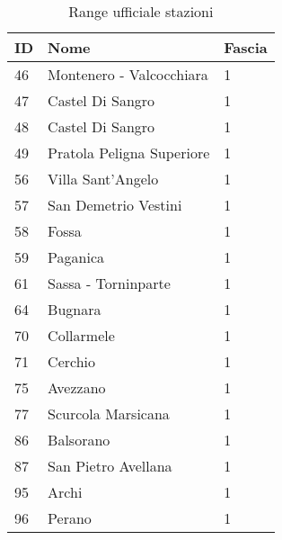 \begin{table}[]
\centering
\caption{Range ufficiale stazioni}
\label{my-label}
\begin{tabular}{|p{1cm}|p{4cm}|p{2cm}|}
\hline
\rowcolor[HTML]{C0C0C0} 
ID  & Nome                                     & Fascia \\ \hline
\rowcolor[HTML]{9AFF99} 
46  & Montenero - Valcocchiara                 & 1      \\ \hline
\rowcolor[HTML]{9AFF99} 
47  & Castel Di Sangro                         & 1      \\ \hline
\rowcolor[HTML]{9AFF99} 
48  & Castel Di Sangro                         & 1      \\ \hline
\rowcolor[HTML]{9AFF99} 
49  & Pratola Peligna Superiore                & 1      \\ \hline
\rowcolor[HTML]{9AFF99} 
56  & Villa Sant'Angelo                        & 1      \\ \hline
\rowcolor[HTML]{9AFF99} 
57  & San Demetrio Vestini                     & 1      \\ \hline
\rowcolor[HTML]{9AFF99} 
58  & Fossa                                    & 1      \\ \hline
\rowcolor[HTML]{9AFF99} 
59  & Paganica                                 & 1      \\ \hline
\rowcolor[HTML]{9AFF99} 
61  & Sassa - Torninparte                      & 1      \\ \hline
\rowcolor[HTML]{9AFF99} 
64  & Bugnara                                  & 1      \\ \hline
\rowcolor[HTML]{9AFF99} 
70  & Collarmele                               & 1      \\ \hline
\rowcolor[HTML]{9AFF99} 
71  & Cerchio                                  & 1      \\ \hline
\rowcolor[HTML]{9AFF99} 
75  & Avezzano                                 & 1      \\ \hline
\rowcolor[HTML]{9AFF99} 
77  & Scurcola Marsicana                       & 1      \\ \hline
\rowcolor[HTML]{9AFF99} 
86  & Balsorano                                & 1      \\ \hline
\rowcolor[HTML]{9AFF99} 
87  & San Pietro Avellana                      & 1      \\ \hline
\rowcolor[HTML]{9AFF99} 
95  & Archi                                    & 1      \\ \hline
\rowcolor[HTML]{9AFF99} 
96  & Perano                                   & 1      \\ \hline

\end{tabular}
\end{table}

